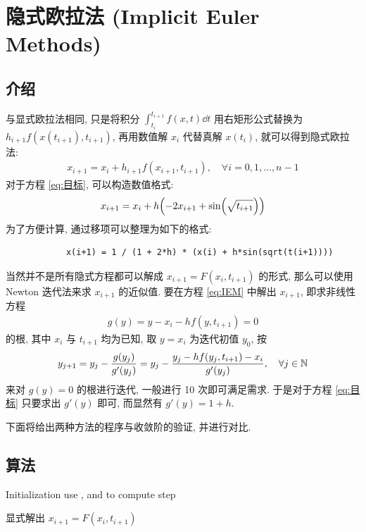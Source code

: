 \documentclass[twoside]{ctexart}
\begin{document}
    \section{隐式欧拉法 (Implicit Euler Methods)}
    \subsection{介绍}
    与显式欧拉法相同, 只是将积分 $ \int_{t_{i}}^{t_{i+1}} f(x, t)\dd{t} $ 用右矩形公式替换为 $ h_{i+1}f(x(t_{i+1}), t_{i+1}) $, 再用数值解 $ x_{i} $ 代替真解 $ x(t_{i}) $, 就可以得到隐式欧拉法:
    \begin{align}\label{eq:IEM}
        x_{i+1} = x_{i} + h_{i+1}f(x_{i+1}, t_{i+1}), \quad \forall i=0, 1, \dots, n-1
    \end{align}
    对于方程 \eqref{eq:目标}, 可以构造数值格式:
    \begin{align*}
        x_{i+1} = x_{i} + h\qty(-2x_{i+1}+\sin(\sqrt{t_{i+1}}))
    \end{align*}
    为了方便计算, 通过移项可以整理为如下的格式:
    \begin{verbatim}
            x(i+1) = 1 / (1 + 2*h) * (x(i) + h*sin(sqrt(t(i+1))))
    \end{verbatim}

    当然并不是所有隐式方程都可以解成 $ x_{i+1}=F(x_{i}, t_{i+1}) $ 的形式, 那么可以使用 Newton 迭代法来求 $ x_{i+1} $ 的近似值. 要在方程 \eqref{eq:IEM} 中解出 $ x_{i+1} $, 即求非线性方程
    \begin{align*}
        g(y)=y - x_{i} - hf(y, t_{i+1})=0
    \end{align*}
    的根, 其中 $ x_{i} $ 与 $ t_{i+1} $ 均为已知, 取 $ y=x_{i} $ 为迭代初值 $ y_{0} $, 按
    \begin{align*}
        y_{j+1} = y_{j}-\frac{g(y_{j})}{g'(y_{j})}=y_{j}-\frac{y_{j}-hf(y_{j}, t_{i+1})-x_{i}}{g'(y_{j})},\quad \forall j\in \mathbb{N}
    \end{align*} 
    来对 $ g(y)=0 $ 的根进行迭代, 一般进行 10 次即可满足需求. 于是对于方程 \eqref{eq:目标} 只要求出 $ g'(y) $ 即可, 而显然有 $ g'(y)=1+h $. 
    
    下面将给出两种方法的程序与收敛阶的验证, 并进行对比.
 
    \subsection{算法}
    \begin{algorithm}[H]

        Initialization\;
        use ,  and  to compute step \;
        \;
        \caption{显式解出 $ x_{i+1}=F(x_{i}, t_{i+1}) $ }
    \end{algorithm}
\end{document}
